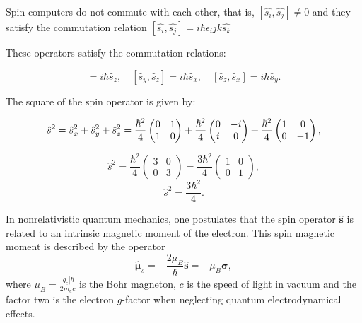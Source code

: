 \documentclass[%
 preprint, linenumbers,
 amsmath,amssymb,
 aps, physrev,
]{revtex4-2}
\begin{document}
Spin computers do not commute with each other, that is, $ [\hat{s_i},\hat{s_j}] \not= 0$ and they satisfy the commutation relation $ [\hat{s_i},\hat{s_j}] = i\hbar \epsilon_ijk \hat{s_k}$

These operators satisfy the commutation relations:

\begin{equation}
    [\hat{s}_x, \hat{s}_y] = i\hbar \hat{s}_z, \quad 
[\hat{s}_y, \hat{s}_z] = i\hbar \hat{s}_x, \quad 
[\hat{s}_z, \hat{s}_x] = i\hbar \hat{s}_y.
\end{equation}


The square of the spin operator is given by:



\begin{equation}
    \hat{s}^2 = \hat{s}_x^2 + \hat{s}_y^2 + \hat{s}_z^2 \\
              =  \frac{\hbar^{2}}{4} \begin{pmatrix}
        0 & 1 \\
        1 & 0
    \end{pmatrix} + \frac{\hbar^{2}}{4} \begin{pmatrix}
        0 & -i \\
        i & 0
    \end{pmatrix} + \frac{\hbar^2}{4} \begin{pmatrix}
        1 & 0 \\
        0 & -1
    \end{pmatrix}, 
\end{equation}

\begin{equation}
    \hat{s}^2 = \frac{\hbar^2}{4} \begin{pmatrix}
        3 & 0\\
        0 & 3 
    \end{pmatrix} =  \frac{3 \hbar^2}{4} \begin{pmatrix}
        1 & 0\\
        0 & 1 
        \end{pmatrix},
\end{equation}
\begin{equation}
     \hat{s}^2 = \frac{3 \hbar^2}{4}.
     \label{eq:9}
\end{equation}

In nonrelativistic quantum mechanics, one postulates that the spin operator $\hat{\mathbf{s}}$ is related to an intrinsic magnetic moment of the electron. This spin magnetic moment is described by the operator
\begin{equation}
    \hat{\bm{\mu}}_s = -\frac{2\mu_B}{\hbar}\hat{\mathbf{s}} = -\mu_B\bm{\sigma},
\end{equation}
where $\mu_B = \frac{|q_e|\hbar}{2m_ec}$ is the Bohr magneton, $c$ is the speed of light in vacuum and the factor two is the electron $g$-factor when neglecting quantum electrodynamical effects.\\
\end{document}
